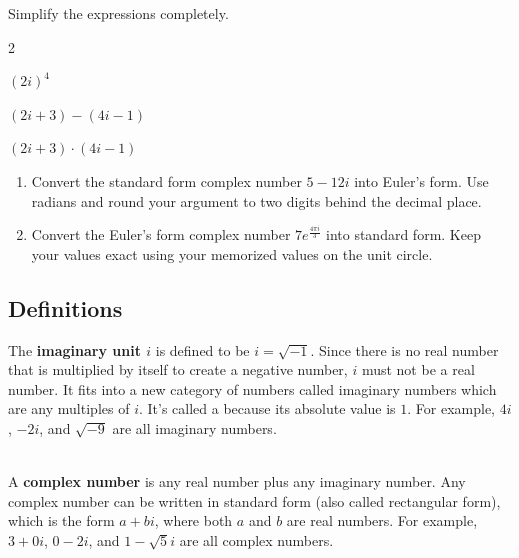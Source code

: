 \newpage

\begin{myPractice}
	Simplify the expressions completely.
	\begin{enumerate}[itemsep=3cm]
	\end{enumerate}
\end{myPractice}
\vfill

\begin{myPractice}
	\begin{enumerate}
		\item Convert the standard form complex number $5-12i$ into Euler's form. Use radians and round your argument to two digits behind the decimal place.
		\vfill
		\item Convert the Euler's form complex number $7e^{\frac{4\pi i}{3}}$ into standard form. Keep your values exact using your memorized values on the unit circle.
		\vfill
	\end{enumerate}
\end{myPractice}

\newpage

\subsection*{Definitions} \label{definitions-section-complex-numbers}

\begin{myDefinition}
The \textbf{imaginary unit $i$} is defined to be $i=\sqrt{-1}$. Since there is no real number that is multiplied by itself to create a negative number, $i$ must not be a real number. It fits into a new category of numbers called imaginary numbers which are any multiples of $i$. It's called a  because its absolute value is $1$.
\newline For example, $4i$, $-2i$, and $\sqrt{-9}$ are all imaginary numbers.
\end{myDefinition}

\begin{myDefinition}~\\[0.5mm]
A \textbf{complex number} is any real number plus any imaginary number. Any complex number can be written in standard form (also called rectangular form), which is the form $a+bi$, where both $a$ and $b$ are real numbers. 
\newline For example, $3+0i$, $0-2i$, and $1-\sqrt{5}i$ are all complex numbers.
\end{myDefinition}

